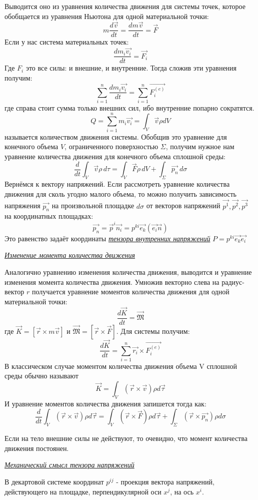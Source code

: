 Выводится оно из уравнения количества движения для системы точек, которое обобщается из уравнения Ньютона для одной материальной точки:
$$
m \frac{d\vec{v}}{dt} = \frac{dm\vec{v}}{dt} = \vec{F}
$$
Если у нас система материальных точек:
$$
\frac{dm_i\vec{v_i}}{dt} = \vec{F_i}
$$
Где $F_i$ это все силы: и внешние, и внутренние. Тогда сложив эти уравнения получим:
$$
\sum_{i = 1}^{n} \frac{dm_i\vec{v_i}}{dt} = \sum_{i = 1}^{n} \vec{F^{(e)}_i}
$$
где справа стоит сумма только внешних сил, ибо внутренние попарно сократятся. 
$$
Q = \sum_{i = 1}^{n} m_i \vec{v_i} = \int_V \vec{v} \rho dV
$$
называется количеством движения системы. Обобщив это уравнение для конечного объема $V$, ограниченного поверхностью $\Sigma$, получим нужное нам уравнение количества движения для конечного объема сплошной среды:
$$
\frac{d}{dt}  \int_{V} \vec{v} \rho \,d\tau =  \int_{V} \vec{F} \rho \,dV  + \int_{\Sigma} \vec{p_n} \,d\sigma
$$
Вернёмся к вектору напряжений. Если рассмотреть уравнение количества движения для сколь угодно малого объема, то можно получить зависимость напряжения $\vec{p_n}$ на произвольной площадке $d\sigma$ от векторов напряжений $\vec{p^1}, \vec{p^2}, \vec{p^3}$ на координатных площадках:
$$
\vec{p_n} = \vec{p}^i\vec{n_i} = p^{ki}\vec{e_k}(\vec{e_i}\vec{n})
$$
Это равенство задаёт координаты \textit{\underline{тензора внутренних напряжений}} $P = p^{ki}\vec{e_k}\vec{e_i}$

\begin{center}
    \textit{\underline{Изменение момента количества движения}}
\end{center}
    Аналогично уравнению изменения количества движения, выводится и уравнение изменения момента количества движения.
    Умножив векторно слева на радиус-вектор $r$ получается уравнение моментов количества движения для одной материальной точки:
$$
\frac{d\vec{K}}{dt} = \vec{\mathfrak{M}}
$$
где $\vec{K} = [\vec{r} \times m\vec{v}]$ и $\vec{\mathfrak{M}} = [\vec{r} \times \vec{F}]$. Для системы получим:
$$
\frac{d\vec{K}}{dt} = \sum_{i=1}^{n}\vec{r_i}\times\vec{F_i^{(e)}}
$$
В классическом случае моментом количества движения объема V сплошной среды обычно называют 
$$
\vec{K} = \int_{V} (\vec{r} \times \vec{v}) \rho d \vec{\tau}
$$
И уравнение моментов количества движения запишется тогда как:
$$
\frac{d}{dt} \int_{V} (\vec{r} \times \vec{v}) \rho d\vec{\tau} = \int_{V} (\vec{r} \times \vec{F}) \rho d\vec{\tau} + \int_{\Sigma} (\vec{r} \times \vec{p_n}) \rho d\sigma
$$

Если на тело внешние силы не действуют, то очевидно, что момент количества движения постоянен.

\begin{center}
    \textit{\underline{Механический смысл тензора напряжений}}
\end{center}
В декартовой системе координат $p^{ij}$ - проекция вектора напряжений, действующего на площадке, перпендикулярной оси $x^j$, на ось $x^i$.
